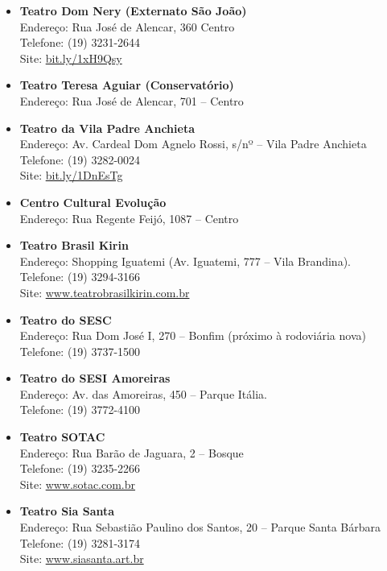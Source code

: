 \begin{itemize}
    \item   \textbf{Teatro Dom Nery (Externato São João)}
        \\Endereço: Rua José de Alencar, 360  Centro
        \\Telefone: (19) 3231-2644  %
        \\Site: \url{bit.ly/1xH9Qsy}

     \item   \textbf{Teatro Teresa Aguiar (Conservatório)}
         \\Endereço: Rua José de Alencar, 701 -- Centro

    \item   \textbf{Teatro da Vila Padre Anchieta}
        \\Endereço: Av. Cardeal Dom Agnelo Rossi, s/nº -- Vila Padre Anchieta
        \\Telefone: (19) 3282-0024
        \\Site: \url{bit.ly/1DnEsTg}

     \item   \textbf{Centro Cultural Evolução}
         \\Endereço: Rua Regente Feijó, 1087 -- Centro

    \item   \textbf{Teatro Brasil Kirin}
		\\Endereço: Shopping Iguatemi (Av. Iguatemi, 777 -- Vila Brandina).
		\\Telefone: (19) 3294-3166
		\\Site: \url{www.teatrobrasilkirin.com.br}

    \item   \textbf{Teatro do SESC}
		\\Endereço: Rua Dom José I, 270 -- Bonfim (próximo à rodoviária nova)
		\\Telefone: (19) 3737-1500

    \item   \textbf{Teatro do SESI Amoreiras}
		\\Endereço: Av. das Amoreiras, 450 -- Parque Itália.
		\\Telefone: (19) 3772-4100

    \item   \textbf{Teatro SOTAC}
		\\Endereço: Rua Barão de Jaguara, 2 -- Bosque
		\\Telefone: (19) 3235-2266
		\\Site: \url{www.sotac.com.br}

    \item   \textbf{Teatro Sia Santa}
		\\Endereço: Rua Sebastião Paulino dos Santos, 20 -- Parque Santa Bárbara
    \\Telefone: (19) 3281-3174
		\\Site: \url{www.siasanta.art.br}
\end{itemize}

